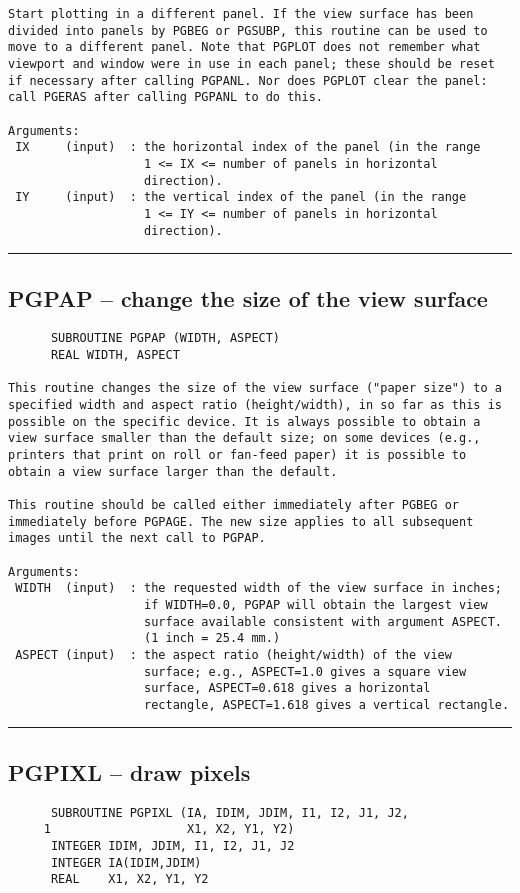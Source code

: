 {\begin{verbatim}
Start plotting in a different panel. If the view surface has been
divided into panels by PGBEG or PGSUBP, this routine can be used to
move to a different panel. Note that PGPLOT does not remember what
viewport and window were in use in each panel; these should be reset
if necessary after calling PGPANL. Nor does PGPLOT clear the panel:
call PGERAS after calling PGPANL to do this.

Arguments:
 IX     (input)  : the horizontal index of the panel (in the range
                   1 <= IX <= number of panels in horizontal
                   direction).
 IY     (input)  : the vertical index of the panel (in the range
                   1 <= IY <= number of panels in horizontal
                   direction).
\end{verbatim}
\hrule


\subsection*{PGPAP -- change the size of the view surface  }
\begin{verbatim}
      SUBROUTINE PGPAP (WIDTH, ASPECT)
      REAL WIDTH, ASPECT

This routine changes the size of the view surface ("paper size") to a
specified width and aspect ratio (height/width), in so far as this is
possible on the specific device. It is always possible to obtain a
view surface smaller than the default size; on some devices (e.g.,
printers that print on roll or fan-feed paper) it is possible to 
obtain a view surface larger than the default.

This routine should be called either immediately after PGBEG or
immediately before PGPAGE. The new size applies to all subsequent
images until the next call to PGPAP.

Arguments:
 WIDTH  (input)  : the requested width of the view surface in inches;
                   if WIDTH=0.0, PGPAP will obtain the largest view
                   surface available consistent with argument ASPECT.
                   (1 inch = 25.4 mm.)
 ASPECT (input)  : the aspect ratio (height/width) of the view
                   surface; e.g., ASPECT=1.0 gives a square view
                   surface, ASPECT=0.618 gives a horizontal
                   rectangle, ASPECT=1.618 gives a vertical rectangle.
\end{verbatim}
\hrule


\subsection*{PGPIXL -- draw pixels }
\begin{verbatim}
      SUBROUTINE PGPIXL (IA, IDIM, JDIM, I1, I2, J1, J2, 
     1                   X1, X2, Y1, Y2)
      INTEGER IDIM, JDIM, I1, I2, J1, J2
      INTEGER IA(IDIM,JDIM)
      REAL    X1, X2, Y1, Y2


\end{verbatim}}
